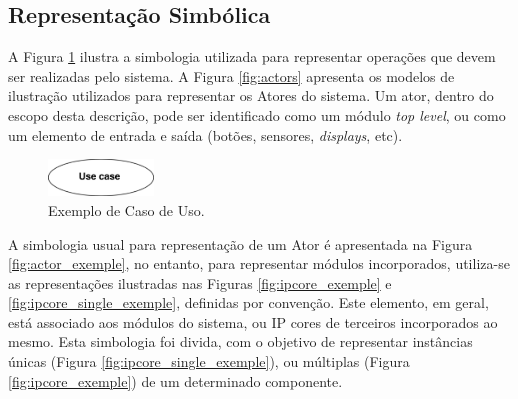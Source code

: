\documentclass{article}
\begin{document}
  \subsection{Representação Simbólica}
  A Figura \ref{fig:uc_exemple} ilustra a simbologia utilizada para representar operações que devem ser realizadas pelo sistema. A Figura \ref{fig:actors} apresenta os modelos de ilustração utilizados para representar os Atores do sistema. Um ator, dentro do escopo desta descrição, pode ser identificado como um módulo \textit{top level}, ou como um elemento de entrada e saída (botões, sensores, \textit{displays}, etc).
  
  \FloatBarrier
  \begin{figure}[H]
    \centering
    \includegraphics[width=0.25\textwidth]{uc_exemple.png}
    \caption{Exemplo de Caso de Uso.}
    \label{fig:uc_exemple}
  \end{figure}
  
  A simbologia usual para representação de um Ator é apresentada na Figura \ref{fig:actor_exemple}, no entanto, para representar módulos incorporados, utiliza-se as representações ilustradas nas Figuras \ref{fig:ipcore_exemple} e \ref{fig:ipcore_single_exemple}, definidas por convenção. Este elemento, em geral, está associado aos módulos do sistema, ou IP cores de terceiros incorporados ao mesmo. Esta simbologia foi divida, com o objetivo de representar instâncias únicas (Figura \ref{fig:ipcore_single_exemple}), ou múltiplas (Figura \ref{fig:ipcore_exemple}) de um determinado componente. 
  
\end{document}
